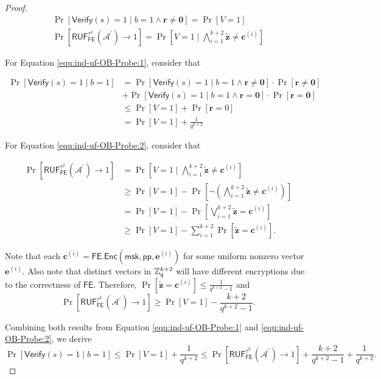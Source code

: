 \begin{proof}
\begin{gather}
	\Pr[\textsf{Verify}(s) = 1 \mid b = 1 \wedge \mathbf{r} \neq \mathbf{0}] = \Pr[V = 1] \label{equ:ind-uf-OB-Probe:1} \\
	\Pr[\textsf{RUF}_\textsf{FE}^{\tau^2}(\mathcal{A}^\prime) \to 1] = \Pr\left[ V = 1 \mid \bigwedge_{i=1}^{k+2} \mathbf{\tilde{z}} \neq \mathbf{c}^{(i)} \right] \label{equ:ind-uf-OB-Probe:2}
\end{gather}

\noindent For Equation \ref{equ:ind-uf-OB-Probe:1}, consider that

\begin{align*}
	\Pr[\textsf{Verify}(s) = 1 \mid b = 1]
	&= \Pr[\textsf{Verify}(s) = 1 \mid b = 1 \wedge \mathbf{r} \neq \mathbf{0}] \cdot \Pr[\mathbf{r} \neq \mathbf{0}] \\
	&+ \Pr[\textsf{Verify}(s) = 1 \mid b = 1 \wedge \mathbf{r} = \mathbf{0}] \cdot \Pr[\mathbf{r} = \mathbf{0}] \\
	&\leq \Pr[V = 1] + \Pr[\mathbf{r} = 0] \\
	&= \Pr[V = 1] + \frac{1}{q^{k+2}} 
\end{align*}

\noindent For Equation \ref{equ:ind-uf-OB-Probe:2}, consider that

\begin{align*}
	\Pr[\textsf{RUF}_\textsf{FE}^{\tau^2}(\mathcal{A}^\prime) \to 1] 
	&= \Pr\left[ V = 1 \mid \bigwedge_{i=1}^{k+2} \mathbf{\tilde{z}} \neq \mathbf{c}^{(i)} \right] \\ 
	& \geq \Pr[V = 1] - \Pr \left[ \neg  \left( \bigwedge_{i=1}^{k+2} \mathbf{\tilde{z}} \neq \mathbf{c}^{(i)} \right) \right] \\
	& = \Pr[V = 1] - \Pr \left[ \bigvee_{i=1}^{k+2} \mathbf{\tilde{z}} = \mathbf{c}^{(i)} \right] \\
	& \geq \Pr[V = 1] - \sum_{i=1}^{k+2} \Pr[\mathbf{\tilde{z}} = \mathbf{c}^{(i)}].
\end{align*}

\noindent Note that each $\mathbf{c}^{(i)} = \textsf{FE.Enc}(\textsf{msk}, \textsf{pp}, \mathbf{e}^{(i)})$ for some uniform nonzero vector $\mathbf{e}^{(i)}$. Also note that distinct vectors in $\mathbb{Z}_q^{k+2}$ will have different encryptions due to the correctness of $\textsf{FE}$. Therefore, $\Pr[\mathbf{\tilde{z}} = \mathbf{c}^{(i)}] \leq \frac{1}{q^{k+2} - 1}$ and
\[
	\Pr[\textsf{RUF}_\textsf{FE}^{\tau^2}(\mathcal{A}^\prime) \to 1] \geq \Pr[V = 1] - \frac{k+2}{q^{k+2}-1}.
\]

\noindent Combining both results from Equation \ref{equ:ind-uf-OB-Probe:1} and \ref{equ:ind-uf-OB-Probe:2}, we derive
\[
	\Pr[\textsf{Verify}(s) = 1 \mid b = 1] \leq \Pr[V = 1] + \frac{1}{q^{k+2}} \leq \Pr[\textsf{RUF}_\textsf{FE}^{\tau^2}(\mathcal{A}^\prime) \to 1] + \frac{k+2}{q^{k+2}-1} + \frac{1}{q^{k+2}}.
\]


\end{proof}
